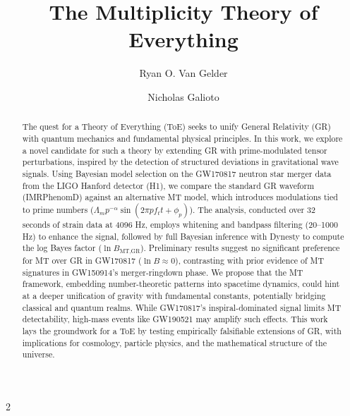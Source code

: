 \documentclass{article}
\theoremstyle{plain}
\begin{document}
\title{The Multiplicity Theory of Everything}
\author{Ryan O. Van Gelder}
\author{Nicholas Galioto}
\maketitle
\nolinenumbers
\begin{abstract}
The quest for a Theory of Everything (ToE) seeks to unify General Relativity (GR) with quantum mechanics and fundamental physical principles. In this work, we explore a novel candidate for such a theory by extending GR with prime-modulated tensor perturbations, inspired by the detection of structured deviations in gravitational wave signals. Using Bayesian model selection on the GW170817 neutron star merger data from the LIGO Hanford detector (H1), we compare the standard GR waveform (IMRPhenomD) against an alternative MT model, which introduces modulations tied to prime numbers (\( \Lambda_m p^{-\alpha} \sin(2\pi p f_t t + \phi_p) \)). The analysis, conducted over 32 seconds of strain data at 4096 Hz, employs whitening and bandpass filtering (20--1000 Hz) to enhance the signal, followed by full Bayesian inference with Dynesty to compute the log Bayes factor (\( \ln B_{\text{MT,GR}} \)). Preliminary results suggest no significant preference for MT over GR in GW170817 (\( \ln B \approx 0 \)), contrasting with prior evidence of MT signatures in GW150914’s merger-ringdown phase. We propose that the MT framework, embedding number-theoretic patterns into spacetime dynamics, could hint at a deeper unification of gravity with fundamental constants, potentially bridging classical and quantum realms. While GW170817’s inspiral-dominated signal limits MT detectability, high-mass events like GW190521 may amplify such effects. This work lays the groundwork for a ToE by testing empirically falsifiable extensions of GR, with implications for cosmology, particle physics, and the mathematical structure of the universe.
\end{abstract}

\newpage

 \begin{multicols}{2}
\begin{singlespace}
\tableofcontents
\end{singlespace}
\end{multicols}

\linenumbers
\end{document}
